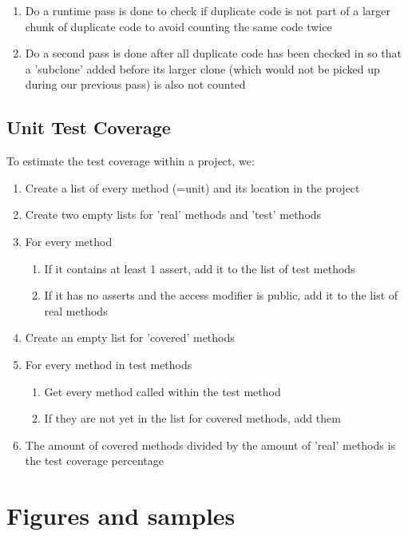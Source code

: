 \documentclass{article}
\begin{document}
\begin{enumerate}
\item Do a runtime pass is done to check if duplicate code is not part of a larger chunk of duplicate code to avoid counting the same code twice
\item Do a second pass is done after all duplicate code has been checked in so that a 'subclone' added before its larger clone (which would not be picked up during our previous pass) is also not counted
\end{enumerate}

\subsection{Unit Test Coverage}\label{pseudo:test}
To estimate the test coverage within a project, we:

\begin{enumerate}
\item Create a list of every method (=unit) and its location in the project
\item Create two empty lists for 'real' methods and 'test' methods
\item For every method
	\begin{enumerate}
	\item If it contains at least 1 assert, add it to the list of test methods
	\item If it has no asserts and the access modifier is public, add it to the list of real methods
	\end{enumerate}
\item Create an empty list for 'covered' methods
\item For every method in test methods
	\begin{enumerate}
	\item Get every method called within the test method
	\item If they are not yet in the list for covered methods, add them
	\end{enumerate}
\item The amount of covered methods divided by the amount of 'real' methods is the test coverage percentage
\end{enumerate}

\section{Figures and samples}
\end{document}
